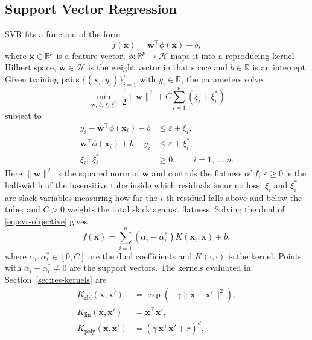 \documentclass[pdflatex,sn-mathphys-num]{sn-jnl}
\begin{document}


\subsection{Support Vector Regression}\label{sec:svr}
SVR \cite{drucker1997,smola2004,vapnik1995} fits a function of the form
\begin{equation}
f(\mathbf{x}) = \mathbf{w}^{\top}\phi(\mathbf{x}) + b ,
\label{eq:svr-primal-fn}
\end{equation}
where $\mathbf{x} \in \mathbb{R}^{p}$ is a feature vector, $\phi : \mathbb{R}^{p} \to \mathcal{H}$ maps it into a reproducing kernel Hilbert space, $\mathbf{w} \in \mathcal{H}$ is the weight vector in that space and $b \in \mathbb{R}$ is an intercept. Given training pairs $\{(\mathbf{x}_i, y_i)\}_{i=1}^{n}$ with $y_i \in \mathbb{R}$, the parameters solve
\begin{equation}
\min_{\mathbf{w},\,b,\,\xi,\,\xi^{*}} \;
\frac{1}{2}\lVert \mathbf{w} \rVert^{2}
+ C \sum_{i=1}^{n} \left( \xi_i + \xi_i^{*} \right)
\label{eq:svr-objective}
\end{equation}
subject to
\begin{align}
y_i - \mathbf{w}^{\top}\phi(\mathbf{x}_i) - b &\le \varepsilon + \xi_i, \label{eq:svr-c1}\\
\mathbf{w}^{\top}\phi(\mathbf{x}_i) + b - y_i &\le \varepsilon + \xi_i^{*}, \label{eq:svr-c2}\\
\xi_i,\; \xi_i^{*} &\ge 0, \qquad i = 1,\dots,n. \label{eq:svr-c3}
\end{align}
Here $\lVert \mathbf{w} \rVert^{2}$ is the squared norm of $\mathbf{w}$ and controls the flatness of $f$; $\varepsilon \ge 0$ is the half-width of the insensitive tube inside which residuals incur no loss; $\xi_i$ and $\xi_i^{*}$ are slack variables measuring how far the $i$-th residual falls above and below the tube; and $C > 0$ weights the total slack against flatness. Solving the dual of \eqref{eq:svr-objective} gives
\begin{equation}
f(\mathbf{x}) = \sum_{i=1}^{n} \left( \alpha_i - \alpha_i^{*} \right) K(\mathbf{x}_i, \mathbf{x}) + b ,
\label{eq:svr-dual}
\end{equation}
where $\alpha_i, \alpha_i^{*} \in [0, C]$ are the dual coefficients and $K(\cdot,\cdot)$ is the kernel. Points with $\alpha_i - \alpha_i^{*} \neq 0$ are the support vectors. The kernels evaluated in Section~\ref{sec:res-kernels} are
\begin{align}
K_{\text{rbf}}(\mathbf{x}, \mathbf{x}') &= \exp\!\left( -\gamma \lVert \mathbf{x} - \mathbf{x}' \rVert^{2} \right), \label{eq:k-rbf}\\
K_{\text{lin}}(\mathbf{x}, \mathbf{x}') &= \mathbf{x}^{\top}\mathbf{x}', \label{eq:k-lin}\\
K_{\text{poly}}(\mathbf{x}, \mathbf{x}') &= \left( \gamma\, \mathbf{x}^{\top}\mathbf{x}' + r \right)^{d}, \label{eq:k-poly}
\end{align}
\end{document}
